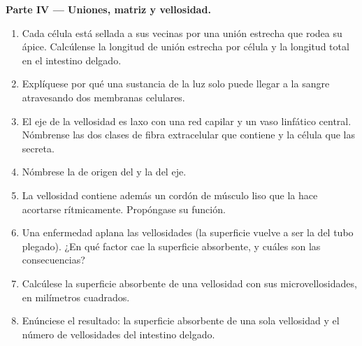\begin{problem}
\medskip
\noindent\textbf{Parte IV --- Uniones, matriz y vellosidad.}
\begin{enumerate}[resume]
  \item Cada célula está sellada a sus vecinas por una unión estrecha que
        rodea su ápice. Calcúlense la longitud de unión estrecha por
        célula y la longitud total en el intestino delgado.
  \item Explíquese por qué una sustancia de la luz solo puede llegar a la
        sangre atravesando dos membranas celulares.
  \item El eje de la vellosidad es  laxo con una red
        capilar y un vaso linfático central. Nómbrense las dos clases de
        fibra extracelular que contiene y la célula que las secreta.
  \item Nómbrese la  de origen del  y la del eje.
  \item La vellosidad contiene además un cordón de músculo liso que la hace
        acortarse rítmicamente. Propóngase su función.
  \item Una enfermedad aplana las vellosidades (la superficie vuelve a ser
        la del tubo plegado). ¿En qué factor cae la superficie absorbente,
        y cuáles son las consecuencias?
  \item Calcúlese la superficie absorbente de una vellosidad con sus
        microvellosidades, en milímetros cuadrados.
  \item Enúnciese el resultado: la superficie absorbente de una sola
        vellosidad y el número de vellosidades del intestino delgado.
\end{enumerate}
\end{problem}
